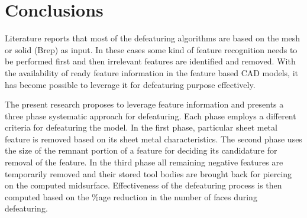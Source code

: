 
\section{Conclusions}

Literature reports that most of the defeaturing algorithms are based on the mesh or solid (Brep) as input. In these cases some kind of feature recognition needs to be performed first and then irrelevant features are identified and removed. With the availability of ready feature information in the feature based CAD models, it has become possible to leverage it for defeaturing purpose effectively. 

The present research proposes to leverage feature information and presents a three phase systematic approach for defeaturing. Each phase employs a different criteria for defeaturing the model. In the first phase, particular sheet metal feature is removed based on its sheet metal characteristics. The second phase uses the size of the remnant portion of a feature for deciding its candidature for removal of the feature. In the third phase all remaining negative features are temporarily removed and their stored tool bodies are brought back for piercing on the computed midsurface. Effectiveness of the defeaturing process is then computed based on the \%age reduction in the number of faces during defeaturing.



